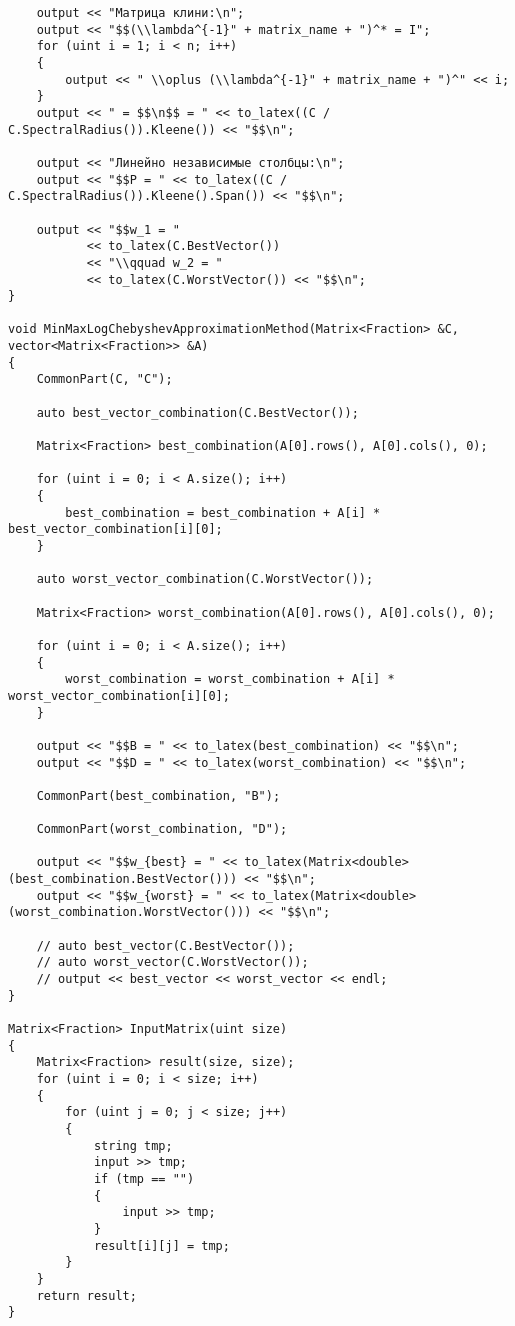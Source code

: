 \begin{lstlisting}
    output << "Матрица клини:\n";
    output << "$$(\\lambda^{-1}" + matrix_name + ")^* = I";
    for (uint i = 1; i < n; i++)
    {
        output << " \\oplus (\\lambda^{-1}" + matrix_name + ")^" << i;
    }
    output << " = $$\n$$ = " << to_latex((C / C.SpectralRadius()).Kleene()) << "$$\n";

    output << "Линейно независимые столбцы:\n";
    output << "$$P = " << to_latex((C / C.SpectralRadius()).Kleene().Span()) << "$$\n";

    output << "$$w_1 = "
           << to_latex(C.BestVector())
           << "\\qquad w_2 = "
           << to_latex(C.WorstVector()) << "$$\n";
}

void MinMaxLogChebyshevApproximationMethod(Matrix<Fraction> &C, vector<Matrix<Fraction>> &A)
{
    CommonPart(C, "C");

    auto best_vector_combination(C.BestVector());

    Matrix<Fraction> best_combination(A[0].rows(), A[0].cols(), 0);

    for (uint i = 0; i < A.size(); i++)
    {
        best_combination = best_combination + A[i] * best_vector_combination[i][0];
    }

    auto worst_vector_combination(C.WorstVector());

    Matrix<Fraction> worst_combination(A[0].rows(), A[0].cols(), 0);

    for (uint i = 0; i < A.size(); i++)
    {
        worst_combination = worst_combination + A[i] * worst_vector_combination[i][0];
    }

    output << "$$B = " << to_latex(best_combination) << "$$\n";
    output << "$$D = " << to_latex(worst_combination) << "$$\n";

    CommonPart(best_combination, "B");

    CommonPart(worst_combination, "D");

    output << "$$w_{best} = " << to_latex(Matrix<double>(best_combination.BestVector())) << "$$\n";
    output << "$$w_{worst} = " << to_latex(Matrix<double>(worst_combination.WorstVector())) << "$$\n";

    // auto best_vector(C.BestVector());
    // auto worst_vector(C.WorstVector());
    // output << best_vector << worst_vector << endl;
}

Matrix<Fraction> InputMatrix(uint size)
{
    Matrix<Fraction> result(size, size);
    for (uint i = 0; i < size; i++)
    {
        for (uint j = 0; j < size; j++)
        {
            string tmp;
            input >> tmp;
            if (tmp == "")
            {
                input >> tmp;
            }
            result[i][j] = tmp;
        }
    }
    return result;
}


\end{lstlisting}

